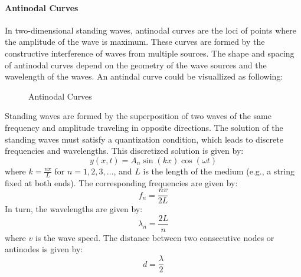 \documentclass[11pt]{report}
\begin{document}
\paragraph{Antinodal Curves} In two-dimensional standing waves, antinodal curves are the loci of points where the amplitude of the wave is maximum. These curves are formed by the constructive interference of waves from multiple sources. The shape and spacing of antinodal curves depend on the geometry of the wave sources and the wavelength of the waves. An antindal curve could be visuallized as following:
\begin{figure}[h!]
    \centering
    \caption{Antinodal Curves}
    \label{fig:antinodal_curves}
\end{figure}


\begin{definition}
    Standing waves are formed by the superposition of two waves of the same frequency and amplitude traveling in opposite directions. The solution of the standing waves must satisfy a quantization condition, which leads to discrete frequencies and wavelengths. This discretized solution is given by:
    \begin{equation}\label{eq:standing_wave}
        y(x,t) = A_n \sin(kx) \cos(\omega t)
    \end{equation}
    where \( k = \frac{n\pi}{L} \) for \( n = 1, 2, 3, \ldots \), and \( L \) is the length of the medium (e.g., a string fixed at both ends). The corresponding frequencies are given by: 
    $$
        f_n = \frac{n v}{2L}
    $$
    In turn, the wavelengths are given by:
    $$
        \lambda_n = \frac{2L}{n}
    $$
    where \( v \) is the wave speed. The distance between two consecutive nodes or antinodes is given by:
    $$
        d = \frac{\lambda}{2}
    $$
    
\end{definition}
\end{document}
